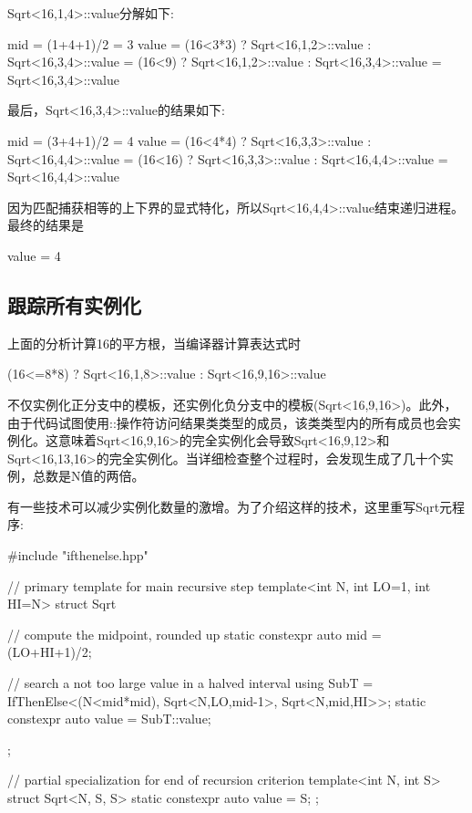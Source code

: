 Sqrt<16,1,4>::value分解如下:

\begin{cpp}
mid = (1+4+1)/2
	= 3
value = (16<3*3) ? Sqrt<16,1,2>::value
				: Sqrt<16,3,4>::value
	  = (16<9) ? Sqrt<16,1,2>::value
				: Sqrt<16,3,4>::value
	  = Sqrt<16,3,4>::value
\end{cpp}

最后，Sqrt<16,3,4>::value的结果如下:

\begin{cpp}
mid = (3+4+1)/2
	= 4
value = (16<4*4) ? Sqrt<16,3,3>::value
				: Sqrt<16,4,4>::value
	  = (16<16) ? Sqrt<16,3,3>::value
				: Sqrt<16,4,4>::value
	  = Sqrt<16,4,4>::value
\end{cpp}

因为匹配捕获相等的上下界的显式特化，所以Sqrt<16,4,4>::value结束递归进程。最终的结果是

\begin{cpp}
value = 4
\end{cpp}

\subsection{跟踪所有实例化}

上面的分析计算16的平方根，当编译器计算表达式时

\begin{cpp}
(16<=8*8) ? Sqrt<16,1,8>::value
		  : Sqrt<16,9,16>::value
\end{cpp}

不仅实例化正分支中的模板，还实例化负分支中的模板(Sqrt<16,9,16>)。此外，由于代码试图使用::操作符访问结果类类型的成员，该类类型内的所有成员也会实例化。这意味着Sqrt<16,9,16>的完全实例化会导致Sqrt<16,9,12>和Sqrt<16,13,16>的完全实例化。当详细检查整个过程时，会发现生成了几十个实例，总数是N值的两倍。

有一些技术可以减少实例化数量的激增。为了介绍这样的技术，这里重写Sqrt元程序:

\begin{cpp}
#include "ifthenelse.hpp"

// primary template for main recursive step
template<int N, int LO=1, int HI=N>
struct Sqrt {
	// compute the midpoint, rounded up
	static constexpr auto mid = (LO+HI+1)/2;
	
	// search a not too large value in a halved interval
	using SubT = IfThenElse<(N<mid*mid),
	Sqrt<N,LO,mid-1>,
	Sqrt<N,mid,HI>>;
	static constexpr auto value = SubT::value;
};

// partial specialization for end of recursion criterion
template<int N, int S>
struct Sqrt<N, S, S> {
	static constexpr auto value = S;
};
\end{cpp}

